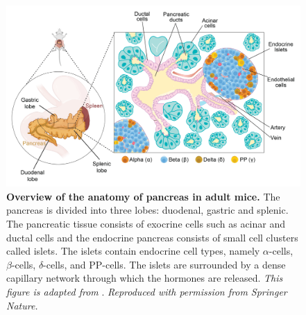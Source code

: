 \begin{figure}[t]
\centering
\includegraphics[width=\linewidth]{Chapter1/Fig/F1-1-01.png}
\caption[Morphology of mouse pancreatic tissue]{\textbf{Overview of the anatomy of pancreas in adult mice.} The pancreas is divided into three lobes: duodenal, gastric and splenic. The pancreatic tissue consists of exocrine cells such as acinar and ductal cells and the endocrine pancreas consists of small cell clusters called islets. The islets contain endocrine cell types, namely $\alpha$-cells, $\beta$-cells, $\delta$-cells, and PP-cells. The islets are surrounded by a dense capillary network through which the hormones are released. \textit{This figure is adapted from }\textbf{\cite{shih_pancreas_2013,jain_targeting_2022}}.\textit{ Reproduced with permission from Springer Nature.}}
\label{fig1-1}
\end{figure}




